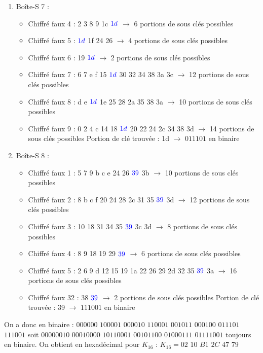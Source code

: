 \documentclass[11pt]{article}
\begin{document}
\begin{enumerate}
\item Boîte-S 7 : 
\begin{itemize}
	\item Chiffré faux 4 : 2 3 8 9 1c $\color{blue}1d$ $\longrightarrow$ 6 portions de sous clés possibles
	\item Chiffré faux 5 : $\color{blue}1d$ 1f 24 26 $\longrightarrow$ 4 portions de sous clés possibles
	\item Chiffré faux 6 : 19 $\color{blue}1d$ $\longrightarrow$ 2 portions de sous clés possibles
	\item Chiffré faux 7 : 6 7 e f 15 $\color{blue}1d$ 30 32 34 38 3a 3c $\longrightarrow$ 12 portions de sous clés possibles
	\item Chiffré faux 8 : d e $\color{blue}1d$ 1e 25 28 2a 35 38 3a $\longrightarrow$ 10 portions de sous clés possibles
	\item Chiffré faux 9 : 0 2 4 c 14 18 $\color{blue}1d$ 20 22 24 2c 34 38 3d $\longrightarrow$ 14 portions de sous clés possibles \newline
	Portion de clé trouvée : 1d $\longrightarrow$ $011101$ en binaire
\end{itemize}

\item Boîte-S 8 : 
\begin{itemize}
	\item Chiffré faux 1 : 5 7 9 b c e 24 26 $\color{blue}39$ 3b $\longrightarrow$ 10 portions de sous clés possibles
	\item Chiffré faux 2 : 8 b c f 20 24 28 2c 31 35 $\color{blue}39$ 3d $\longrightarrow$ 12 portions de sous clés possibles
	\item Chiffré faux 3 : 10 18 31 34 35 $\color{blue}39$ 3c 3d $\longrightarrow$ 8 portions de sous clés possibles
	\item Chiffré faux 4 : 8 9 18 19 29 $\color{blue}39$ $\longrightarrow$ 6 portions de sous clés possibles
	\item Chiffré faux 5 : 2 6 9 d 12 15 19 1a 22 26 29 2d 32 35 $\color{blue}39$ 3a $\longrightarrow$ 16 portions de sous clés possibles
	\item Chiffré faux 32 : 38 $\color{blue}39$ $\longrightarrow$ 2 portions de sous clés possibles \newline
	Portion de clé trouvée : 39 $\longrightarrow$ $111001$ en binaire
\end{itemize}

\end{enumerate}

On a donc en binaire : $000000$ $100001$ $000010$ $110001$ $001011$ $000100$ $011101$ $111001$ \newline 
soit $00000010$ $00010000$ $10110001$ $00101100$ $01000111$ $01111001$ toujours en binaire. \newline
On obtient en hexadécimal pour $K_{16}$ : \color{red} $K_{16}=02$ $10$ $B1$ $2C$ $47$ $79$\color{black}
\end{document}
